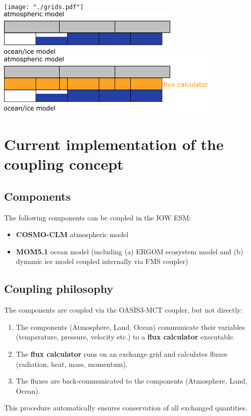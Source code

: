 \documentclass[a4paper,titlepage]{scrartcl}
\begin{document}
\begin{center}
\texttt{[image: "./grids.pdf"]} \\
\includegraphics[scale=1.0]{"./grids1D.pdf"} \\
\vspace{2em}
\includegraphics[scale=1.0]{"./grids1D_plus_exchange.pdf"}
\end{center}


\section{Current implementation of the coupling concept}

\subsection{Components}
The following components can be coupled in the IOW ESM:
\begin{itemize}
\item \textbf{COSMO-CLM} atmospheric model
\item \textbf{MOM5.1} ocean model (including (a) ERGOM ecosystem model and (b) dynamic ice model coupled internally via FMS coupler)
\end{itemize}

\subsection{Coupling philosophy}
The components are coupled via the OASIS3-MCT coupler, but not directly:
\begin{enumerate}
\item The components (Atmosphere, Land, Ocean) communicate their variables (temperature, pressure, velocity etc.) to a \textbf{flux calculator} executable.
\item The \textbf{flux calculator} runs on an exchange grid and calculates  fluxes (radiation, heat, mass, momentum).
\item The fluxes are back-communicated to the components (Atmosphere, Land, Ocean).
\end{enumerate}
This procedure automatically ensures conservation of all exchanged quantities.
\end{document}
